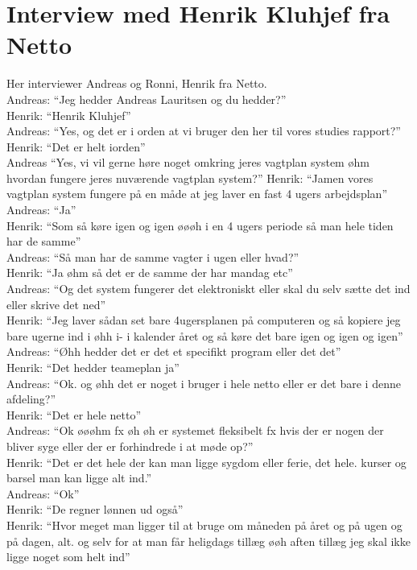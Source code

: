 \section{Interview med Henrik Kluhjef fra Netto}\label{app:netto}
Her interviewer Andreas og Ronni, Henrik fra Netto.\\
Andreas: “Jeg hedder Andreas Lauritsen og du hedder?”\\
Henrik: “Henrik Kluhjef”\\
Andreas: “Yes, og det er i orden at vi bruger den her til vores studies rapport?”\\
Henrik: “Det er helt iorden”\\
Andreas “Yes, vi vil gerne høre noget omkring jeres vagtplan system øhm hvordan fungere jeres nuværende vagtplan system?”
Henrik: “Jamen vores vagtplan system fungere på en måde at jeg laver en fast 4 ugers arbejdsplan”\\
Andreas: “Ja”\\
Henrik: “Som så køre igen og igen øøøh i en 4 ugers periode så man hele tiden har de samme”\\
Andreas: “Så man har de samme vagter i ugen eller hvad?”\\
Henrik: “Ja øhm så det er de samme der har mandag etc”\\
Andreas: “Og det system fungerer det elektroniskt eller skal du selv sætte det ind eller skrive det ned”\\
Henrik: “Jeg laver sådan set bare 4ugersplanen på computeren og så kopiere jeg bare ugerne ind i øhh i- i kalender året og så køre det bare igen og igen og igen”\\
Andreas: “Øhh hedder det er det et specifikt program eller det det”\\
Henrik: “Det hedder teameplan ja”\\
Andreas: “Ok. og øhh det er noget i bruger i hele netto eller er det bare i denne afdeling?”\\
Henrik: “Det er hele netto”\\
Andreas: “Ok øøøhm fx øh øh er systemet fleksibelt fx hvis der er nogen der bliver syge eller der er forhindrede i at møde op?”\\
Henrik: “Det er det hele der kan man ligge sygdom eller ferie, det hele. kurser og barsel man kan ligge alt ind.”\\
Andreas: “Ok”\\
Henrik: “De regner lønnen ud også”\\
Henrik: “Hvor meget man ligger til at bruge om måneden på året og på ugen og på dagen, alt. og selv for at man får heligdags tillæg øøh aften tillæg jeg skal ikke ligge noget som helt ind”\\
